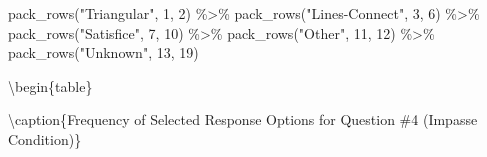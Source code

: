 \documentclass[
  letterpaper,
  DIV=11,
  numbers=noendperiod]{scrreprt}
\newenvironment{Shaded}{\begin{snugshade}}{\end{snugshade}}
\newcommand{\DecValTok}[1]{\textcolor[rgb]{0.68,0.00,0.00}{#1}}
\newcommand{\FunctionTok}[1]{\textcolor[rgb]{0.28,0.35,0.67}{#1}}
\newcommand{\NormalTok}[1]{\textcolor[rgb]{0.00,0.23,0.31}{#1}}
\newcommand{\SpecialCharTok}[1]{\textcolor[rgb]{0.37,0.37,0.37}{#1}}
\newcommand{\StringTok}[1]{\textcolor[rgb]{0.13,0.47,0.30}{#1}}
\begin{document}
\begin{Shaded}
\begin{Highlighting}[]
  \FunctionTok{pack\_rows}\NormalTok{(}\StringTok{"Triangular"}\NormalTok{, }\DecValTok{1}\NormalTok{, }\DecValTok{2}\NormalTok{) }\SpecialCharTok{\%\textgreater{}\%} 
  \FunctionTok{pack\_rows}\NormalTok{(}\StringTok{"Lines{-}Connect"}\NormalTok{, }\DecValTok{3}\NormalTok{, }\DecValTok{6}\NormalTok{) }\SpecialCharTok{\%\textgreater{}\%} 
  \FunctionTok{pack\_rows}\NormalTok{(}\StringTok{"Satisfice"}\NormalTok{, }\DecValTok{7}\NormalTok{, }\DecValTok{10}\NormalTok{) }\SpecialCharTok{\%\textgreater{}\%} 
  \FunctionTok{pack\_rows}\NormalTok{(}\StringTok{"Other"}\NormalTok{, }\DecValTok{11}\NormalTok{, }\DecValTok{12}\NormalTok{) }\SpecialCharTok{\%\textgreater{}\%} 
  \FunctionTok{pack\_rows}\NormalTok{(}\StringTok{"Unknown"}\NormalTok{, }\DecValTok{13}\NormalTok{, }\DecValTok{19}\NormalTok{) }
\end{Highlighting}
\end{Shaded}

\textbackslash begin\{table\}

\textbackslash caption\{\label{tab:Q4-IMPASSE-RESPONSES}Frequency of
Selected Response Options for Question \#4 (Impasse Condition)\}
\centering
\end{document}
